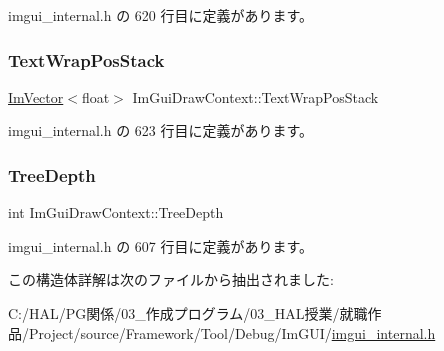  imgui\+\_\+internal.\+h の 620 行目に定義があります。

\mbox{\label{struct_im_gui_draw_context_ac282b2f910a8846f4c200c358974b12a}} 
\subsubsection{\texorpdfstring{Text\+Wrap\+Pos\+Stack}{TextWrapPosStack}}
{\footnotesize\ttfamily \mbox{\hyperlink{class_im_vector}{Im\+Vector}}$<$float$>$ Im\+Gui\+Draw\+Context\+::\+Text\+Wrap\+Pos\+Stack}



 imgui\+\_\+internal.\+h の 623 行目に定義があります。

\mbox{\label{struct_im_gui_draw_context_a08d8578fe382425a67b4f5e5257b5436}} 
\subsubsection{\texorpdfstring{Tree\+Depth}{TreeDepth}}
{\footnotesize\ttfamily int Im\+Gui\+Draw\+Context\+::\+Tree\+Depth}



 imgui\+\_\+internal.\+h の 607 行目に定義があります。



この構造体詳解は次のファイルから抽出されました\+:\begin{DoxyCompactItemize}
\item 
C\+:/\+H\+A\+L/\+P\+G関係/03\+\_\+作成プログラム/03\+\_\+\+H\+A\+L授業/就職作品/\+Project/source/\+Framework/\+Tool/\+Debug/\+Im\+G\+U\+I/\mbox{\hyperlink{imgui__internal_8h}{imgui\+\_\+internal.\+h}}\end{DoxyCompactItemize}
